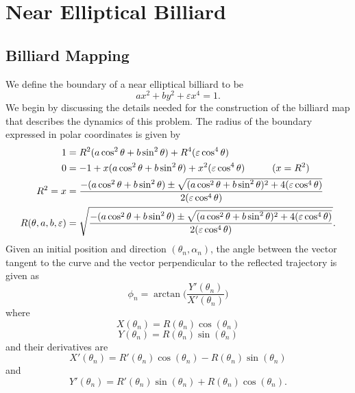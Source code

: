 \chapter{Near Elliptical Billiard}

\section{Billiard Mapping}

We define the boundary of a near elliptical billiard to be
\[
    a x^2 + b y^2 + \varepsilon x^4 = 1.
\]
We begin by discussing the details needed for the construction of the billiard map that describes the dynamics of this problem. The radius of the boundary expressed in polar coordinates is given by
\begin{align}
          1 &=  R^2(a\cos^2\theta + b\sin^2\theta)  + R^4(\varepsilon\cos^4\theta) \\
          0 &= -1 + x(a\cos^2\theta + b\sin^2\theta)  + x^2(\varepsilon\cos^4\theta) \hspace{10mm} (x = R^2) \\
            R^2 = x &= \frac{-(a\cos^2\theta + b\sin^2\theta) \pm \sqrt{(a\cos^2\theta + b\sin^2\theta)^2 + 4(\varepsilon\cos^4\theta)}}{2(\varepsilon\cos^4\theta)} \\
R(\theta,a,b,\varepsilon) &= \sqrt{\frac{-(a\cos^2\theta + b\sin^2\theta) \pm \sqrt{(a\cos^2\theta + b\sin^2\theta)^2 + 4(\varepsilon\cos^4\theta)}}{2(\varepsilon\cos^4\theta)} } .
\end{align}
Given an initial position and direction $(\theta_n,\alpha_n)$, the angle between the vector tangent to the curve and the vector perpendicular to the reflected trajectory is given as
\begin{equation}
    \phi_n = \arctan\Big(\frac{Y'(\theta_n)}{X'(\theta_n)}\Big)
\end{equation}
where 
\begin{equation}
    X(\theta_n) = R(\theta_n)\cos(\theta_n)
\end{equation}
\begin{equation}
    Y(\theta_n) = R(\theta_n)\sin(\theta_n)
\end{equation}
and their derivatives are
\begin{equation}
    X'(\theta_n) = R'(\theta_n)\cos(\theta_n) - R(\theta_n)\sin(\theta_n) 
\end{equation}
and
\begin{equation}
    Y'(\theta_n) = R'(\theta_n)\sin(\theta_n) + R(\theta_n)\cos(\theta_n).
\end{equation}

